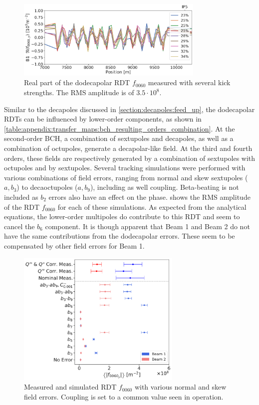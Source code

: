 \begin{figure}[!htb]
    \centering
    \includegraphics[width=0.8\textwidth]{./images/f0060y_all_meas_real.pdf}
    \caption{Real part of the dodecapolar RDT $f_{0060}$ measured with several kick strengths. The
    RMS amplitude is of $3.5\cdot10^{8}$.}
    \label{fig:high_orders:dodecapolar_f0060}
\end{figure}

Similar to the decapoles discussed in \cref{section:decapoles:feed_up}, the dodecapolar RDTs can be
influenced by lower-order components, as shown in
\cref{table:appendix:transfer_maps:bch_resulting_orders_combination}. At the second-order BCH, a
combination of sextupoles and decapoles, as well as a combination of octupoles, generate a
decapolar-like field. At the third and fourth orders, these fields are respectively generated by a
combination of sextupoles with octupoles and by sextupoles.
Several tracking simulations were performed with various combinations of field errors, ranging from
normal and skew sextupoles ($a,b_3$) to decaoctupoles ($a,b_9$), including as well coupling.
Beta-beating is not included as $b_2$ errors also have an effect on the phase.
 shows the RMS amplitude of the RDT $f_{0060}$ for each of
these simulations. As expected from the analytical equations, the lower-order multipoles do
contribute to this RDT and seem to cancel the $b_6$ component. It is though apparent that Beam 1 and
Beam 2 do not have the same contributions from the dodecapolar errors. These seem to be compensated
by other field errors for Beam 1.

\begin{figure}[H]
    \centering
    \includegraphics[width=0.7\textwidth]{./images/simulations_f0060.pdf}
    \caption{Measured and simulated RDT $f_{0060}$ with various normal and skew field errors.
    Coupling is set to a common value seen in operation.}
    \label{fig:high_orders:simulations_f0060}
\end{figure}

